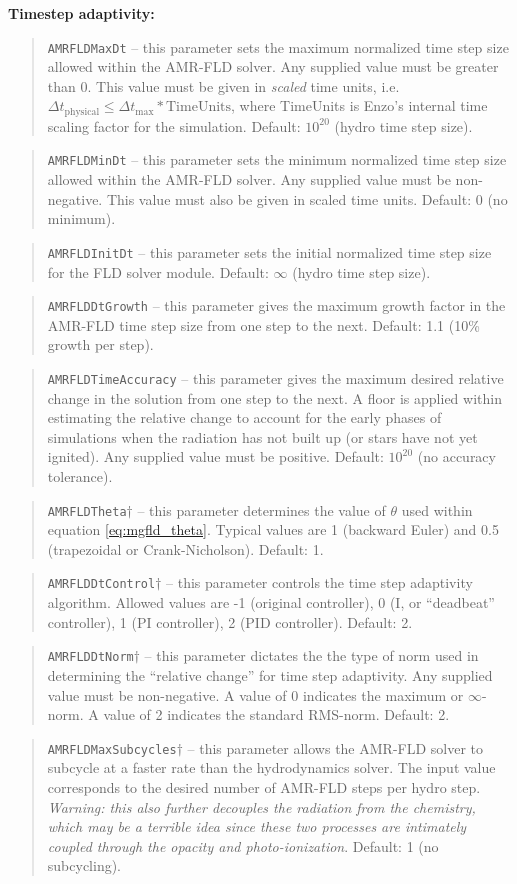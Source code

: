 \documentclass[10pt]{article}
\renewcommand{\(}{\left(}
\renewcommand{\)}{\right)}
\newcommand{\dt}{\Delta t}
\begin{document}
{\bf Timestep adaptivity:}

\blockquote{{\tt AMRFLDMaxDt} -- this parameter sets the maximum
  normalized time step size allowed within the AMR-FLD solver.  Any
  supplied value must be greater than 0.  This value must be given in
  {\em scaled} time units, i.e.~$\dt_{\text{physical}} \le
  \dt_{\text{max}}*\text{TimeUnits}$, where TimeUnits is Enzo's
  internal time scaling factor for the simulation. Default: $10^{20}$
  (hydro time step size).}
%
\blockquote{{\tt AMRFLDMinDt} -- this parameter sets the minimum
  normalized time step size allowed within the AMR-FLD solver.  Any
  supplied value must be non-negative.  This value must also be given
  in scaled time units. Default: 0 (no minimum).}
%
\blockquote{{\tt AMRFLDInitDt} -- this parameter sets the initial
  normalized time step size for the FLD solver module.  Default:
  $\infty$ (hydro time step size).}
%
\blockquote{{\tt AMRFLDDtGrowth} -- this parameter gives the maximum
  growth factor in the AMR-FLD time step size from one step to the
  next.  Default: 1.1 (10\% growth per step).}
%
\blockquote{{\tt AMRFLDTimeAccuracy} -- this parameter gives the
  maximum desired relative change in the solution from one step to the
  next.  A floor is applied within estimating the relative change to
  account for the early phases of simulations when the radiation has
  not built up (or stars have not yet ignited).  Any supplied value
  must be positive.  Default: $10^{20}$ (no accuracy tolerance).}
%
\blockquote{{\tt AMRFLDTheta}$\dagger$ -- this parameter determines
  the value of $\theta$ used within equation \eqref{eq:mgfld_theta}.
  Typical values are 1 (backward Euler) and 0.5 (trapezoidal or
  Crank-Nicholson).  Default: 1.}
%
\blockquote{{\tt AMRFLDDtControl}$\dagger$ -- this parameter controls
  the time step adaptivity algorithm.  Allowed values are -1 (original
  controller), 0 (I, or ``deadbeat'' controller), 1 (PI controller), 2
  (PID controller).  Default: 2.}
%
\blockquote{{\tt AMRFLDDtNorm}$\dagger$ -- this parameter dictates the
  the type of norm used in determining the ``relative change'' for
  time step adaptivity.  Any supplied value must be non-negative.  A
  value of 0 indicates the maximum or $\infty$-norm.  A value of 2
  indicates the standard RMS-norm.  Default: 2.}
%
\blockquote{{\tt AMRFLDMaxSubcycles}$\dagger$ -- this parameter allows
  the AMR-FLD solver to subcycle at a faster rate than the
  hydrodynamics solver.  The input value corresponds to the desired
  number of AMR-FLD steps per hydro step.  {\em Warning: this also
  further decouples the radiation from the chemistry, which may be a
  terrible idea since these two processes are intimately coupled
  through the opacity and photo-ionization}.  Default: 1 (no subcycling).}
\end{document}
